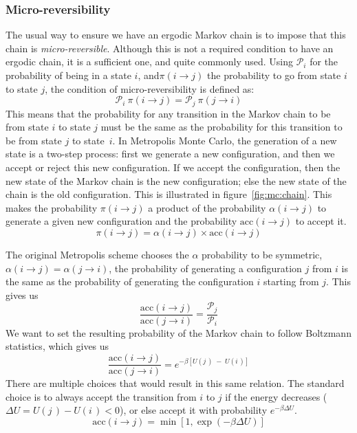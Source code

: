 \documentclass[thesis]{subfiles}
\begin{document}
\subsubsection{Micro-reversibility}

The usual way to ensure we have an ergodic Markov chain is to impose that this
chain is \emph{micro-reversible}. Although this is not a required condition to
have an ergodic chain, it is a sufficient one\cite{Frenkel2002}, and quite
commonly used. Using $\mathcal{P}_i$ for the probability of being in a state
$i$, and$\pi(i \to j)$ the probability to go from state $i$ to state $j$, the
condition of micro-reversibility is defined as:
\[ \mathcal{P}_i \ \pi(i \to j) = \mathcal{P}_j \ \pi(j \to i)\]
This means that the probability for any transition in the Markov chain to be
from state $i$ to state $j$ must be the same as the probability for this
transition to be from state $j$ to state~$i$. In Metropolis Monte Carlo, the
generation of a new state is a two-step process: first we generate a new
configuration, and then we accept or reject this new configuration. If we accept
the configuration, then the new state of the Markov chain is the new
configuration; else the new state of the chain is the old configuration. This is
illustrated in figure~\ref{fig:mc:chain}. This makes the probability $\pi(i \to
j)$ a product of the probability $\alpha(i \to j)$ to generate a given new
configuration and the probability $\text{acc}(i \to j)$ to accept it.
\[\pi(i \to j) = \alpha(i \to j)\times\text{acc}(i \to j)\]

The original Metropolis scheme\cite{Metropolis1953} chooses the $\alpha$
probability to be symmetric, \ie $\alpha(i \to j) = \alpha(j \to i)$, the
probability of generating a configuration $j$ from $i$ is the same as the
probability of generating the configuration $i$ starting from $j$. This gives us
\[ \frac{\text{acc}(i \to j)}{\text{acc}(j \to i)} = \frac{\mathcal{P}_j}{\mathcal{P}_i} \label{eq:mc:acceptance}\]
We want to set the resulting probability of the Markov chain to follow Boltzmann
statistics, which gives us
\[ \frac{\text{acc}(i \to j)}{\text{acc}(j \to i)} = e^{-\beta [U(j\,) \;-\; U(i\,)]} \]
There are multiple choices that would result in this same relation. The standard
choice is to always accept the transition from $i$ to $j$ if the energy
decreases ($\Delta U = U(j\,) - U(i\,) < 0$), or else accept it with probability
$e^{-\beta \Delta U}$.
\[\text{acc}(i \to j) = \min\left[1, \exp\left(-\beta \Delta U\right)\right] \label{eq:mc:acceptance:nvt}\]
\end{document}
